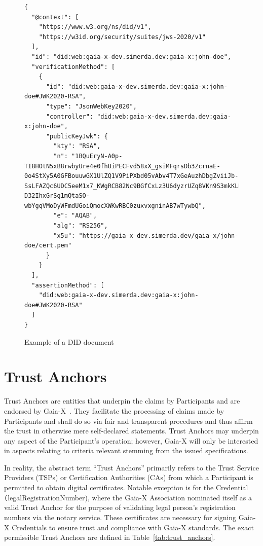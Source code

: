 \begin{figure}
    \centering
    \begin{verbatim}
{
  "@context": [
    "https://www.w3.org/ns/did/v1",
    "https://w3id.org/security/suites/jws-2020/v1"
  ],
  "id": "did:web:gaia-x-dev.simerda.dev:gaia-x:john-doe",
  "verificationMethod": [
    {
      "id": "did:web:gaia-x-dev.simerda.dev:gaia-x:john-doe#JWK2020-RSA",
      "type": "JsonWebKey2020",
      "controller": "did:web:gaia-x-dev.simerda.dev:gaia-x:john-doe",
      "publicKeyJwk": {
        "kty": "RSA",
        "n": "1BQuEryN-A0p-TI8HOtN5xB8rwbyUre4e0fhUiPECFvd58xX_gsiMFqrsDb3ZcrnaE-0o4StXy5A0GFBouuwGX1UlZQ1V9PiPXbd05vAbv4T7xGeAuzhDbgZviiJb-SsLFAZQc6UDC5eeM1x7_KWgRCB82Nc9BGfCxLz3U6dyzrUZq8VKn9S3mkKLLuslewa00X8TCHEAVQFEktVV9F617GXEknrEZhKoZfPeuiweMj4FxuamBRQPaZlCWQduiDnVkmNu4pr7C7HJQkBxxH-D32IhxGrSg1mQtaSO-wbYgqVMoDyWFmdUGoiQmocXWKwRBC0zuxvxgninAB7wTywbQ",
        "e": "AQAB",
        "alg": "RS256",
        "x5u": "https://gaia-x-dev.simerda.dev/gaia-x/john-doe/cert.pem"
      }
    }
  ],
  "assertionMethod": [
    "did:web:gaia-x-dev.simerda.dev:gaia-x:john-doe#JWK2020-RSA"
  ]
}
    \end{verbatim}
    \caption{Example of a DID document}\label{fig:did_document}
\end{figure}

\section{Trust Anchors}\label{sec:trust-anchors}

Trust Anchors are entities that underpin the claims by Participants and are endorsed by Gaia-X~\cite{gaiax_trust_framework}.
They facilitate the processing of claims made by Participants and shall do so via fair and transparent procedures and thus affirm the trust in otherwise mere self-declared statements.
Trust Anchors may underpin any aspect of the Participant's operation; however, Gaia-X will only be interested in aspects relating to criteria relevant stemming from the issued specifications.

In reality, the abstract term ``Trust Anchors'' primarily refers to the Trust Service Providers (TSPs) or Certification Authorities (CAs) from which a Participant is permitted to obtain digital certificates.
Notable exception is for the Credential \texttt(legalRegistrationNumber), where the Gaia-X Association nominated itself as a valid Trust Anchor for the purpose of validating legal person's registration numbers via the notary service.
These certificates are necessary for signing Gaia-X Credentials to ensure trust and compliance with Gaia-X standards.
The exact permissible Trust Anchors are defined in Table~\ref{tab:trust_anchors}.

